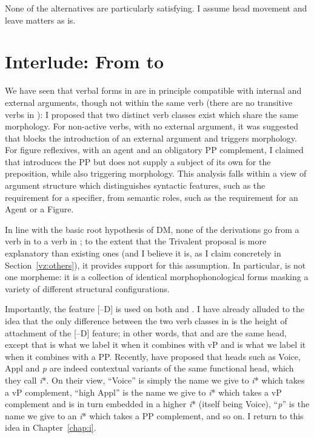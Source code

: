 None of the alternatives are particularly satisfying. I assume head movement and leave matters as is.


\section{Interlude: From {\tnif} to {\thit}} \label{vz:interim}
We have seen that verbal forms in {\tnif} are in principle compatible with internal and external arguments, though not within the same verb (there are no transitive verbs in {\tnif}):
I proposed that two distinct verb classes exist which share the same morphology. For non-active verbs, with no external argument, it was suggested that {\vz} blocks the introduction of an external argument and triggers {\tnif} morphology. For figure reflexives, with an agent and an obligatory PP complement, I claimed that {\pz} introduces the PP but does not supply a subject of its own for the preposition, while also triggering {\tnif} morphology. This analysis falls within a view of argument structure which distinguishes syntactic features, such as the requirement for a specifier, from semantic roles, such as the requirement for an Agent or a Figure.

In line with the basic root hypothesis of DM, none of the derivations go from a verb in {\tkal} to a verb in {\tnif}; to the extent that the Trivalent proposal is more explanatory than existing ones (and I believe it is, as I claim concretely in Section~\ref{vz:others}), it provides support for this assumption. In particular, {\tnif} is not one morpheme: it is a collection of identical morphophonological forms masking a variety of different structural configurations.

Importantly, the feature [--D] is used on both {\vz} and {\pz}. I have already alluded to the idea that the only difference between the two verb classes in {\tnif} is the height of attachment of the [--D] feature; in other words, that {\vz} and {\pz} are the same head, except that {\vz} is what we label it when it combines with vP and {\pz} is what we label it when it combines with a PP. Recently, \cite{woodmarantz17} have proposed that heads such as Voice, Appl and \emph{p} are indeed contextual variants of the same functional head, which they call \emph{i}*. On their view, ``Voice'' is simply the name we give to \emph{i}* which takes a vP complement, ``high Appl'' is the name we give to \emph{i}* which takes a vP complement and is in turn embedded in a higher \emph{i}* (itself being Voice), ``\emph{p}'' is the name we give to an \emph{i}* which takes a PP complement, and so on. I return to this idea in Chapter~\ref{chap:i}.

